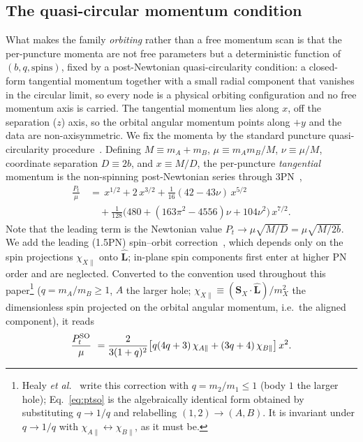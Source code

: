 \documentclass[
  aps,
  prd,
  twocolumn,
  amsmath,
  amssymb,
  nofootinbib,
  superscriptaddress,
  floatfix,
]{revtex4-2}
\begin{document}
\subsection{The quasi-circular momentum condition}
\label{sec:model:qc}
What makes the family \emph{orbiting} rather than a free momentum scan is that the
per-puncture momenta are not free parameters but a deterministic function of
$(b,q,\text{spins})$, fixed by a post-Newtonian quasi-circularity condition: a
closed-form tangential momentum together with a small radial component that
vanishes in the circular limit, so every node is a physical orbiting configuration
and no free momentum axis is carried. The tangential momentum lies along $x$, off
the separation ($z$) axis, so the orbital angular momentum points along $+y$ and
the data are non-axisymmetric. We fix the momenta by the standard
puncture quasi-circularity procedure~\cite{Husa2008,Walther2009}. Defining
$M \equiv m_A+m_B$, $\mu \equiv m_Am_B/M$, $\nu \equiv \mu/M$, coordinate separation $D \equiv 2b$, and
$x\equiv M/D$, the per-puncture \emph{tangential} momentum is the non-spinning
post-Newtonian series through 3PN~\cite{Walther2009},
\begin{equation}
\begin{aligned}
    \frac{P_t}{\mu} \, &= \, x^{1/2} + 2\,x^{3/2} + \tfrac{1}{16}(42-43\nu)\,x^{5/2} \\
        &\quad + \tfrac{1}{128}\bigl(480 + (163\pi^2-4556)\nu + 104\nu^2\bigr)\,x^{7/2} .
\end{aligned}
\label{eq:pt}
\end{equation}
Note that the leading term is the Newtonian value $P_t\to\mu\sqrt{M/D}=\mu\sqrt{M/2b}$. We
add the leading (1.5PN) spin--orbit
correction~\cite{Healy2024}, which depends only on the spin projections $\chi_{X\parallel}$
onto $\hat{\mathbf{L}}$; in-plane spin components first enter at higher PN order and
are neglected. Converted to the convention used throughout this
paper\footnote{Healy \emph{et al.}~\cite{Healy2024} write this correction with
$q=m_2/m_1\le1$ (body $1$ the larger hole); Eq.~\eqref{eq:ptso} is the
algebraically identical form obtained by substituting $q\to1/q$ and relabelling
$(1,2)\to(A,B)$. It is invariant under $q\to1/q$ with
$\chi_{A\parallel}\leftrightarrow\chi_{B\parallel}$, as it must be.}
($q=m_A/m_B\ge1$, $A$ the larger hole; $\chi_{X\parallel} \equiv (\mathbf{S}_X\!\cdot\!\hat{\mathbf{L}})/m_X^2$
the dimensionless spin projected on the orbital angular momentum, i.e.\ the aligned component), it reads
\begin{equation}
  \frac{P_t^{\rm SO}}{\mu} \ = \-\frac{2}{3(1+q)^2}\bigl[q(4q+3)\,\chi_{A\parallel} + (3q+4)\,\chi_{B\parallel}\bigr]\,x^2 .
  \label{eq:ptso}
\end{equation}
\end{document}
